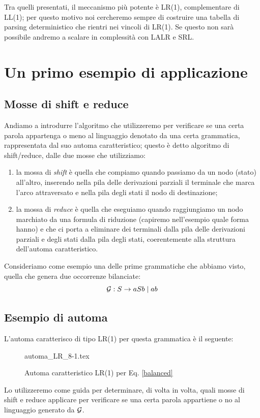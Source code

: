 \documentclass[class=book, crop=false, oneside, 12pt]{standalone}
\begin{document}
Tra quelli presentati, il meccanismo più potente è LR(1), complementare di LL(1); per questo motivo noi cercheremo sempre di costruire una tabella di parsing deterministico che rientri nei vincoli di LR(1). Se questo non sarà possibile andremo a scalare in complessità con LALR e SRL.

\section{Un primo esempio di applicazione}
\subsection{Mosse di shift e reduce}
Andiamo a introdurre l'algoritmo che utilizzeremo per verificare se una certa parola appartenga o meno al linguaggio denotato da una certa grammatica, rappresentata dal suo automa caratteristico; questo è detto algoritmo di shift/reduce, dalle due mosse che utilizziamo:
\begin{enumerate}
    \item la mossa di \emph{shift} è quella che compiamo quando passiamo da un nodo (stato) all'altro, inserendo nella pila delle derivazioni parziali il terminale che marca l'arco attraversato e nella pila degli stati il nodo di destinazione;
    \item la mossa di \emph{reduce} è quella che eseguiamo quando raggiungiamo un nodo marchiato da una formula di riduzione (capiremo nell'esempio quale forma hanno) e che ci porta a eliminare dei terminali dalla pila delle derivazioni parziali e degli stati dalla pila degli stati, coerentemente alla struttura dell'automa caratteristico.
\end{enumerate}
Consideriamo come esempio una delle prime grammatiche che abbiamo visto, quella che genera due occorrenze bilanciate:
\begin{equation}
    \label{balanced}
    \mathcal{G}: S \to aSb \mid ab
\end{equation}
\subsection{Esempio di automa}
L'automa caratterisco di tipo LR(1) per questa grammatica è il seguente:
\begin{figure}[H]
    \centering
	{automa_LR_8-1.tex}
    \caption{Automa caratteristico LR(1) per Eq. \ref{balanced}}
    \label{balanced-char_aut-lr1}
\end{figure}
Lo utilizzeremo come guida per determinare, di volta in volta, quali mosse di shift e reduce applicare per verificare se una certa parola appartiene o no al linguaggio generato da \(\mathcal{G}\). 
\end{document}
